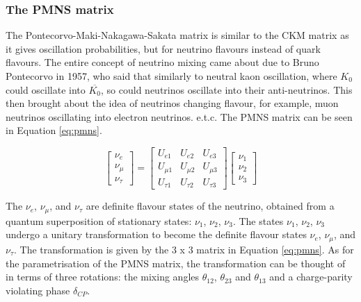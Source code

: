 \documentclass[11pt,oneside,a4paper]{article}
\begin{document}
\subsubsection{The PMNS matrix}

The Pontecorvo-Maki-Nakagawa-Sakata matrix is similar to the CKM matrix as it gives oscillation probabilities, but for neutrino flavours instead of quark flavours. The entire concept of neutrino mixing came about due to Bruno Pontecorvo in 1957, who said that similarly to neutral kaon oscillation, where $K_0$ could oscillate into $\overline{K_0}$, so could neutrinos oscillate into their anti-neutrinos. This then brought about the idea of neutrinos changing flavour, for example, muon neutrinos oscillating into electron neutrinos. e.t.c. The PMNS matrix can be seen in Equation \ref{eq:pmns}.

\begin{equation}
\label{eq:pmns}
{\begin{bmatrix}{\nu _{e}}\\{\nu _{\mu }}\\{\nu _{\tau }}\end{bmatrix}}={\begin{bmatrix}U_{e1}&U_{e2}&U_{e3}\\U_{\mu 1}&U_{\mu 2}&U_{\mu 3}\\U_{\tau 1}&U_{\tau 2}&U_{\tau 3}\end{bmatrix}}{\begin{bmatrix}\nu _{1}\\\nu _{2}\\\nu _{3}\end{bmatrix}}
\end{equation}

The $\nu_e$, $\nu_{\mu}$, and  $\nu_{\tau}$ are definite flavour states of the neutrino, obtained from a quantum superposition of stationary states: $\nu_1$, $\nu_2$, $\nu_3$. The states $\nu_1$, $\nu_2$, $\nu_3$ undergo a unitary transformation to become the definite flavour states $\nu_e$, $\nu_{\mu}$, and  $\nu_{\tau}$. The transformation is given by the 3 x 3 matrix in Equation \ref{eq:pmns}. As for the parametrisation of the PMNS matrix, the transformation can be thought of in terms of three rotations: the mixing angles $\theta_{12}$, $\theta_{23}$ and $\theta_{13}$ and a charge-parity violating phase $\delta_{CP}$.
\end{document}
